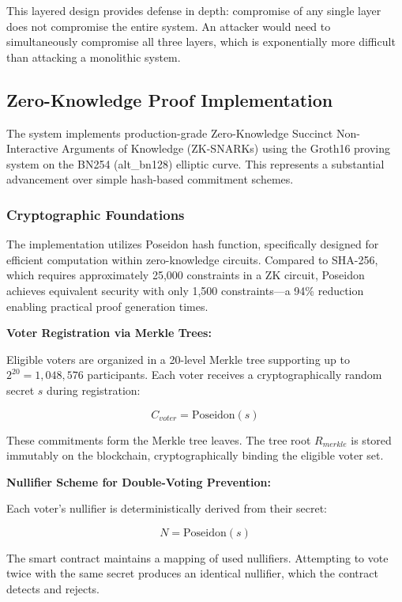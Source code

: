 \documentclass[conference]{IEEEtran}
\begin{document}
This layered design provides defense in depth: compromise of any single layer does not compromise the entire system. An attacker would need to simultaneously compromise all three layers, which is exponentially more difficult than attacking a monolithic system.

\subsection{Zero-Knowledge Proof Implementation}

The system implements production-grade Zero-Knowledge Succinct Non-Interactive Arguments of Knowledge (ZK-SNARKs) using the Groth16 proving system on the BN254 (alt\_bn128) elliptic curve. This represents a substantial advancement over simple hash-based commitment schemes.

\subsubsection{Cryptographic Foundations}

The implementation utilizes Poseidon hash function, specifically designed for efficient computation within zero-knowledge circuits. Compared to SHA-256, which requires approximately 25,000 constraints in a ZK circuit, Poseidon achieves equivalent security with only 1,500 constraints---a 94\% reduction enabling practical proof generation times.

\textbf{Voter Registration via Merkle Trees:}

Eligible voters are organized in a 20-level Merkle tree supporting up to $2^{20} = 1,048,576$ participants. Each voter receives a cryptographically random secret $s$ during registration:

\begin{equation}
C_{voter} = \text{Poseidon}(s)
\end{equation}

These commitments form the Merkle tree leaves. The tree root $R_{merkle}$ is stored immutably on the blockchain, cryptographically binding the eligible voter set.

\textbf{Nullifier Scheme for Double-Voting Prevention:}

Each voter's nullifier is deterministically derived from their secret:

\begin{equation}
N = \text{Poseidon}(s)
\end{equation}

The smart contract maintains a mapping of used nullifiers. Attempting to vote twice with the same secret produces an identical nullifier, which the contract detects and rejects.
\end{document}
